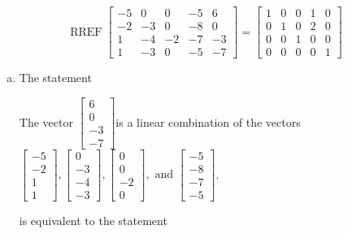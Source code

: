 \begin{exerciseAnswer} 
\[\operatorname{RREF}  \left[\begin{array}{cccc|c}
-5 & 0 & 0 & -5 & 6 \\
-2 & -3 & 0 & -8 & 0 \\
1 & -4 & -2 & -7 & -3 \\
1 & -3 & 0 & -5 & -7
\end{array}\right] = \left[\begin{array}{cccc|c}
1 & 0 & 0 & 1 & 0 \\
0 & 1 & 0 & 2 & 0 \\
0 & 0 & 1 & 0 & 0 \\
0 & 0 & 0 & 0 & 1
\end{array}\right] \]
\begin{enumerate}[(a)]
\item  The statement 
\begin{center}\begin{minipage}{0.8\textwidth}
 The vector \( \left[\begin{array}{c}
6 \\
0 \\
-3 \\
-7
\end{array}\right] \)is a linear combination of the vectors \( \left[\begin{array}{c}
-5 \\
-2 \\
1 \\
1
\end{array}\right] , \left[\begin{array}{c}
0 \\
-3 \\
-4 \\
-3
\end{array}\right] , \left[\begin{array}{c}
0 \\
0 \\
-2 \\
0
\end{array}\right] , \text{ and } \left[\begin{array}{c}
-5 \\
-8 \\
-7 \\
-5
\end{array}\right] \). 
\end{minipage}\end{center}
     is equivalent to the statement 
\begin{center}\begin{minipage}{0.8\textwidth}

\end{minipage}
\end{center}
\end{enumerate}
\end{exerciseAnswer}
